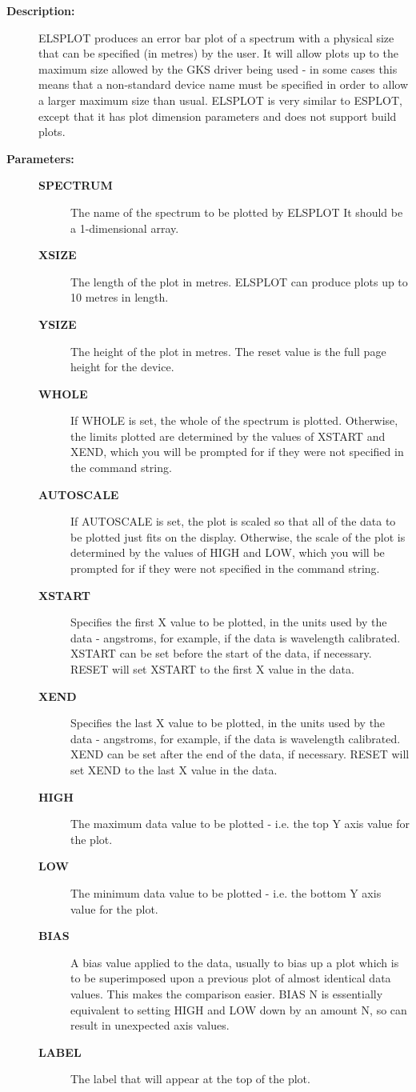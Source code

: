\begin{description}
\begin{description}
\item [\textbf{Description:}]
 ELSPLOT produces an error bar plot of a spectrum with a physical
 size that can be specified (in metres) by the user. It will
 allow plots up to the maximum size allowed by the GKS driver
 being used - in some cases this means that a non-standard device
 name must be specified in order to allow a larger maximum size
 than usual.  ELSPLOT is very similar to ESPLOT, except that it
 has plot dimension parameters and does not support build plots.

\item [\textbf{Parameters:}]
\begin{description}
\item [\textbf{SPECTRUM}]
 The name of the spectrum to be plotted by ELSPLOT
 It should be a 1-dimensional array.
\item [\textbf{XSIZE}]
 The length of the plot in metres.  ELSPLOT
 can produce plots up to 10 metres in length.
\item [\textbf{YSIZE}]
 The height of the plot in metres.  The reset
 value is the full page height for the device.
\item [\textbf{WHOLE}]
 If WHOLE is set, the whole of the spectrum is plotted.
 Otherwise, the limits plotted are determined by the values of
 XSTART and XEND, which you will be prompted for if they were
 not specified in the command string.
\item [\textbf{AUTOSCALE}]
 If AUTOSCALE is set, the plot is scaled so that all of the
 data to be plotted just fits on the display.  Otherwise,
 the scale of the plot is determined by the values of HIGH and
 LOW, which you will be prompted for if they were not specified
 in the command string.
\item [\textbf{XSTART}]
 Specifies the first X value to be plotted, in the units used
 by the data - angstroms, for example, if the data is wavelength
 calibrated.  XSTART can be set before the start of the data, if
 necessary.  RESET will set XSTART to the first X value in the
 data.
\item [\textbf{XEND}]
 Specifies the last X value to be plotted, in the units
 used by the data - angstroms, for example, if the data
 is wavelength calibrated.  XEND can be set after the end
 of the data, if necessary.  RESET will set XEND to the last
 X value in the data.
\item [\textbf{HIGH}]
 The maximum data value to be plotted - i.e. the top Y axis
 value for the plot.
\item [\textbf{LOW}]
 The minimum data value to be plotted - i.e. the bottom Y axis
 value for the plot.
\item [\textbf{BIAS}]
 A bias value applied to the data, usually to bias up a
 plot which is to be superimposed upon a previous plot of
 almost identical data values.  This makes the comparison
 easier.  BIAS N  is essentially equivalent to setting HIGH
 and LOW down by an amount N, so can result in unexpected
 axis values.
\item [\textbf{LABEL}]
 The label that will appear at the top of the plot.
\end{description}


\end{description}
\end{description}
